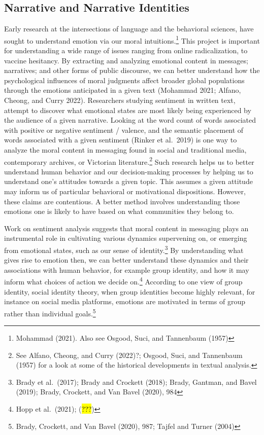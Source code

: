 \documentclass[
  letterpaper,
  DIV=11,
  numbers=noendperiod]{scrartcl}
\theoremstyle{remark}
\begin{document}
\subsection{Narrative and Narrative
Identities}\label{narrative-and-narrative-identities-1}

Early research at the intersections of language and the behavioral
sciences, have sought to understand emotion via our moral
intuitions.\footnote{Mohammad (2021). Also see Osgood, Suci, and
  Tannenbaum (1957)} This project is important for understanding a wide
range of issues ranging from online radicalization, to vaccine
hesitancy. By extracting and analyzing emotional content in messages;
narratives; and other forms of public discourse, we can better
understand how the psychological influences of moral judgments affect
broader global populations through the emotions anticipated in a given
text (Mohammad 2021; Alfano, Cheong, and Curry 2022). Researchers
studying sentiment in written text, attempt to discover what emotional
states are most likely being experienced by the audience of a given
narrative. Looking at the word count of words associated with positive
or negative sentiment / valence, and the semantic placement of words
associated with a given sentiment (Rinker et al.~2019) is one way to
analyze the moral content in messaging found in social and traditional
media, contemporary archives, or Victorian literature.\footnote{See
  Alfano, Cheong, and Curry (2022)?; Osgood, Suci, and Tannenbaum (1957)
  for a look at some of the historical developments in textual analysis.}
Such research helps us to better understand human behavior and our
decision-making processes by helping us to understand one's attitudes
towards a given topic. This assumes a given attitude may inform us of
particular behavioral or motivational dispositions. However, these
claims are contentious. A better method involves understanding those
emotions one is likely to have based on what communities they belong to.

Work on sentiment analysis suggests that moral content in messaging
plays an instrumental role in cultivating various dynamics supervening
on, or emerging from emotional states, such as our sense of
identity.\footnote{Brady et al.~(2017); Brady and Crockett (2018);
  Brady, Gantman, and Bavel (2019); Brady, Crockett, and Van Bavel
  (2020), 984} By understanding what gives rise to emotion then, we can
better understand these dynamics and their associations with human
behavior, for example group identity, and how it may inform what choices
of action we decide on.\footnote{Hopp et al.~(2021); (\hl{???})}
According to one view of group identity, social identity theory, when
group identities become highly relevant, for instance on social media
platforms, emotions are motivated in terms of group rather than
individual goals.\footnote{Brady, Crockett, and Van Bavel (2020), 987;
  Tajfel and Turner (2004)}
\end{document}
